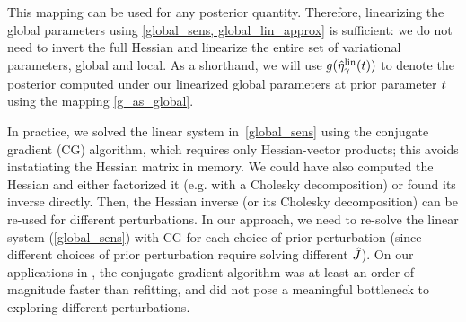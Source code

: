 This mapping can be used for any posterior quantity.
Therefore, linearizing the global parameters using \eqref{global_sens, global_lin_approx} is sufficient:
we do not need to invert the full Hessian
and linearize the entire set of variational parameters, global and local.
As a shorthand, we will use $g(\hat\eta^{\mathrm{lin}}_\gamma(t))$ to
denote the posterior computed under our linearized global parameters
at prior parameter $t$ using the mapping \eqref{g_as_global}.

In practice, we solved the linear system in~\eqref{global_sens} using
the conjugate gradient (CG) algorithm, which requires only Hessian-vector products;
this avoids instatiating the Hessian matrix in memory.
We could have also computed the Hessian and
either factorized it (e.g. with a Cholesky decomposition) or found its inverse directly.
Then, the Hessian inverse (or its Cholesky decomposition) can
be re-used for different perturbations.
In our approach, we need to re-solve the linear system (\eqref{global_sens}) with
CG for each choice of prior perturbation (since different choices of prior perturbation
require solving different $\hat J$).
On our applications in , the conjugate gradient algorithm was at least
an order of magnitude faster than refitting, and did not pose a meaningful bottleneck
to exploring different perturbations.
